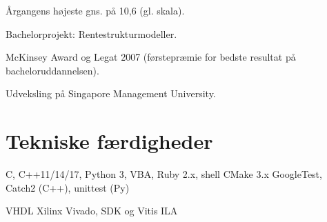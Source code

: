 \documentclass[a4paper]{janus-resume} %
\begin{document}
\begin{minipage}[t]{0.49\textwidth}
\sectionspace %

Årgangens højeste gns. på 10,6 (gl. skala).
\begin{tightitemize}
\item Bachelorprojekt: Rentestrukturmodeller. \\
\item McKinsey Award og Legat 2007 (førstepræmie for bedste resultat på bacheloruddannelsen). \\
\item Udveksling på Singapore Management University. \\
\end{tightitemize}

\sectionspace %




\sectionspace %


\section{Tekniske færdigheder}


C, C++11/14/17, Python 3, VBA, Ruby 2.x, shell 
\textbullet{} CMake 3.x 
\textbullet{} GoogleTest, Catch2 (C++), unittest (Py) \\
\sectionspace %

VHDL 
\textbullet{} Xilinx Vivado, SDK og Vitis
\textbullet{} ILA \\
\sectionspace %


\end{minipage}
\end{document}
